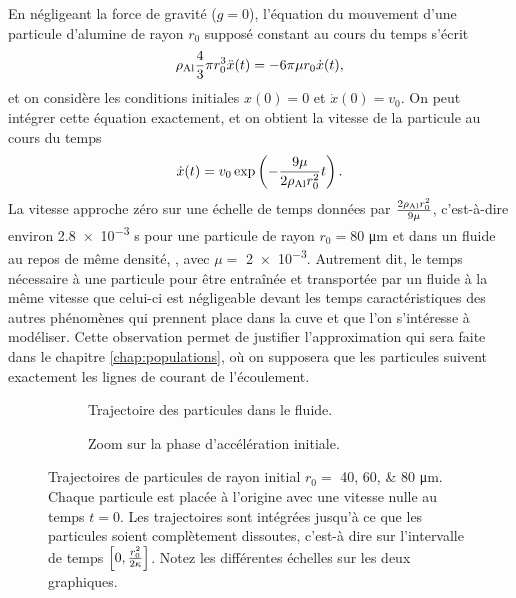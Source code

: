 \begin{remarque}
  En négligeant la force de gravité ($g = 0$), l'équation du mouvement
  d'une particule d'alumine de rayon $r_0$ supposé constant au cours
  du temps s'écrit
  \begin{equation*}
    \rho_\mathrm{Al} \frac{4}{3}\pi r_0^3 \ddot x(t) = -
    6\pi\mu r_0 \dot x(t),
  \end{equation*}
  et on considère les conditions initiales $x(0) = 0$ et $\dot x(0) =
  v_0$. On peut intégrer cette équation exactement, et on obtient la
  vitesse de la particule au cours du temps
  \begin{equation*}
    \dot x(t) = v_0\exp\left( -\frac{9\mu}{2\rho_\mathrm{Al} r_0^2}t \right).
  \end{equation*}
  La vitesse approche zéro sur une échelle de temps données par
  $\frac{2\rho_\mathrm{Al} r_0^2}{9\mu}$,
  c'est-à-dire environ \num{2.8e-3} \si{\second} pour une particule de
  rayon $r_0 = \num{80}$ \si{\micro\meter} et dans un fluide au repos
  de même densité, \ie, avec $\mu = $ \num{2e-3}. Autrement dit, le
  temps nécessaire à une particule pour être entraînée et transportée
  par un fluide à la même vitesse que celui-ci est négligeable devant
  les temps caractéristiques des autres phénomènes qui prennent place
  dans la cuve et que l'on s'intéresse à modéliser. Cette observation
  permet de justifier l'approximation qui sera faite dans le chapitre
  \ref{chap:populations}, où on supposera que les particules suivent
  exactement les lignes de courant de l'écoulement.
\end{remarque}

\begin{figure}
 \begin{center}
    \begin{subfigure}[b]{0.49\textwidth}
      
      \caption{Trajectoire des particules dans le fluide.}
      \label{fig:particle-trajectories-a}
    \end{subfigure}
    \begin{subfigure}[b]{0.49\textwidth}
      
      \caption{Zoom sur la phase d'accélération initiale.}
      \label{fig:particle-trajectories-b}
    \end{subfigure}

    \caption{Trajectoires de particules de rayon initial
      $r_0 = $ \numlist{40;60;80} \si{\micro\meter}. Chaque
    particule est placée à l'origine avec une vitesse nulle
    au temps $t = 0$. Les trajectoires sont intégrées jusqu'à ce que
    les particules soient complètement dissoutes, c'est-à dire sur l'intervalle
    de temps $\left[0, \frac{r_0^2}{2\kappa}\right]$. Notez
    les différentes échelles sur les deux graphiques.}
    \label{fig:particle-trajectories}
 \end{center}
\end{figure}


